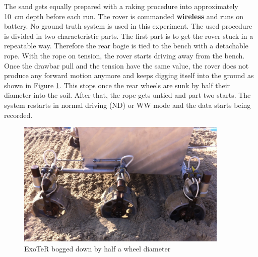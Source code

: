 \documentclass[a4paper,twocolumn]{esapub2005} %
\begin{document}


The sand gets equally prepared with a raking procedure into approximately 10~\unit{cm} depth before each run.  The rover is commanded \textbf{wireless} and runs on battery. No ground truth system is used in this experiment. The used procedure is divided in two characteristic parts. The first part is to get the rover stuck in a repeatable way. Therefore the rear bogie is tied to the bench with a detachable rope. With the rope on tension, the rover starts driving away from the bench. Once the drawbar pull and the tension have the same value, the rover does not produce any forward motion anymore and keeps digging itself into the ground as shown in Figure \ref{fig:volleyexoterdigg}. This stops once the rear wheels are sunk by half their diameter into the soil. After that, the rope gets untied and part two starts. The system restarts in normal driving (ND) or WW mode and the data starts being recorded. 

\begin{figure}[h!]
    \centering
    \includegraphics[width=0.9\textwidth]{volleyexoterdigg.jpg}
    \caption{ExoTeR bogged down by half a wheel diameter}
    \label{fig:volleyexoterdigg}
\end{figure}
\end{document}
